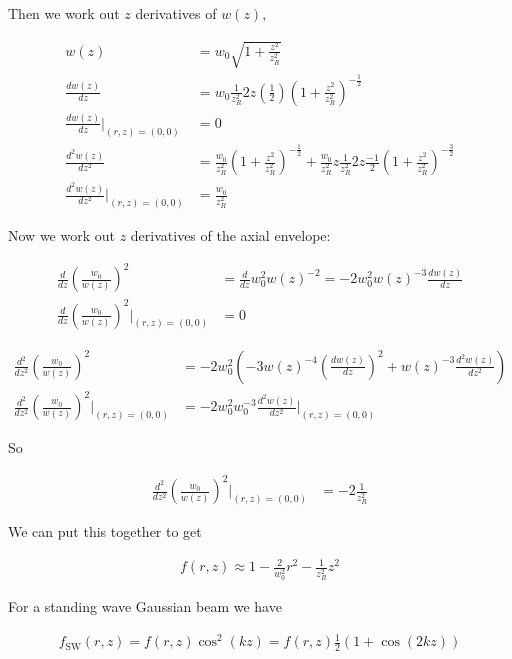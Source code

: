 \documentclass[12pt]{article}
\begin{document}
Then we work out $z$ derivatives of $w(z)$,

\begin{align}
w(z) &= w_0 \sqrt{1+\frac{z^2}{z_R^2}}\\
\frac{dw(z)}{dz} &= w_0 \frac{1}{z_R^2} 2z \left(\frac{1}{2}\right)\left(1+\frac{z^2}{z_R^2} \right)^{-\frac{1}{2}}\\
\frac{dw(z)}{dz}\Big|_{(r,z)=(0,0)} &= 0\\
\frac{d^2w(z)}{dz^2} &= \frac{w_0}{z_R^2} \left(1+\frac{z^2}{z_R^2} \right)^{-\frac{1}{2}} + \frac{w_0}{z_R^2} z \frac{1}{z_R^2} 2z \frac{-1}{2} \left(1+ \frac{z^2}{z_R^2} \right)^{-\frac{3}{2}}\\
\frac{d^2w(z)}{dz^2}\Big|_{(r,z) = (0,0)} &= \frac{w_0}{z_R^2}
\end{align}

Now we work out $z$ derivatives of the axial envelope:

\begin{align}
\frac{d}{dz} \left(\frac{w_0}{w(z)} \right)^2 &= \frac{d}{dz} w_0^2 w(z)^{-2} = -2w_0^2 w(z)^{-3} \frac{dw(z)}{dz}\\
\frac{d}{dz}\left(\frac{w_0}{w(z)} \right)^2\Big|_{(r,z) = (0,0)} &= 0
\end{align}

\begin{align}
\frac{d^2}{dz^2} \left(\frac{w_0}{w(z)} \right)^2 &= -2w_0^2\left(-3 w(z)^{-4} \left(\frac{dw(z)}{dz} \right)^2 + w(z)^{-3} \frac{d^2w(z)}{dz^2} \right)\\
\frac{d^2}{dz^2} \left(\frac{w_0}{w(z)} \right)^2\Big|_{(r,z) = (0,0)} &= -2w_0^2 w_0^{-3} \frac{d^2w(z)}{dz^2}\Big|_{(r,z)=(0,0)}
\end{align}

So

\begin{align}
\frac{d^2}{dz^2} \left(\frac{w_0}{w(z)} \right)^2\Big|_{(r,z) = (0,0)} &= -2\frac{1}{z_R^2}
\end{align}

We can put this together to get

\begin{align}
f(r,z) \approx 1 - \frac{2}{w_0^2} r^2 - \frac{1}{z_R^2} z^2
\end{align}

For a standing wave Gaussian beam we have 

\begin{align}
f_{\text{SW}}(r,z) = f(r,z)\cos^2(k z)= f(r,z)\frac{1}{2}(1+\cos(2kz))
\end{align}
\end{document}
